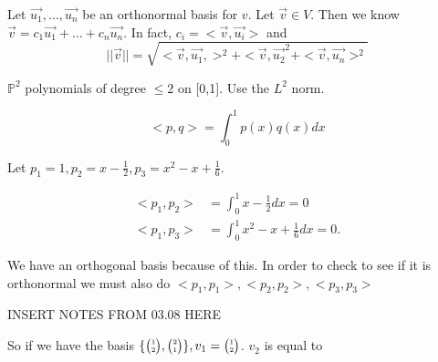   \begin{theorem}
    Let $\vec{u_1},\ldots,\vec{u_n}$ be an orthonormal basis for $v$. Let $\vec{v}\in V$. Then we know $\vec{v}=c_1\vec{u_1}+\ldots+c_n \vec{u_n}$. In fact, $c_i=<\vec{v},\vec{u_i}>$ and 
    \begin{equation}
      | |\vec{v} | | = \sqrt{<\vec{v},\vec{u_1},>^2+<\vec{v},\vec{u_2}^2 + <\vec{v},\vec{u_n}>^2}
    \end{equation}
  \end{theorem}

  \begin{problem}
    $\mathbb{P}^2$ polynomials of degree $\le 2$ on [0,1]. Use the $L^2$ norm.

    \begin{equation}
      <p,q> = \int_0^{1}p(x)q(x)dx
    \end{equation}

    Let $p_1=1,p_2=x-\frac{1}{2},p_3=x^2-x+\frac{1}{6}$.

    \begin{align}
      <p_1,p_2> &= \int_0^{1}x-\frac{1}{2}dx=0\\
      <p_1,p_3>&=\int_0^{1}x^2-x+\frac{1}{6}dx=0.
    \end{align}

    We have an orthogonal basis because of this. In order to check to see if it is orthonormal we must also do $<p_1,p_1>,<p_2,p_2>,<p_3,p_3>$
  \end{problem}
  INSERT NOTES FROM 03.08 HERE

  So if we have the basis $\{\SmallMatrix{1\\2},\SmallMatrix{2\\1}\}, v_1=\SmallMatrix{1\\2}$. $v_2$ is equal to 

